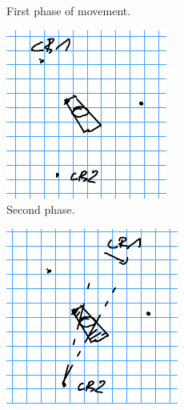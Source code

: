 \begin{figure}[h!]
\begin{subfigure}[t]{0.3\linewidth}
		\caption{First phase of movement.}
		\label{fig:triangle_2}
	\end{subfigure}
	\hfill
	\begin{subfigure}[t]{0.3\linewidth}
		\centering
		\includegraphics[width=\linewidth]{graphics/triangle_3.png}
		\caption{Second phase.}
		\label{fig:triangle_3}
	\end{subfigure}
	\hfill
	\begin{subfigure}[t]{0.3\linewidth}
		\centering
		\includegraphics[width=\linewidth]{graphics/triangle_4.png}

\end{subfigure}
\end{figure}
